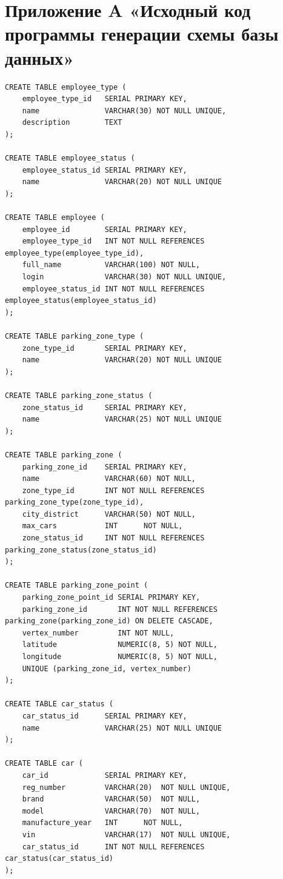 
\section*{Приложение A «Исходный код программы генерации схемы базы данных»}\label{app:A}

\begin{lstlisting}[style=sqlstyle, caption={SQL-скрипт для создания схемы базы данных}, label={lst:schema}]
CREATE TABLE employee_type (
    employee_type_id   SERIAL PRIMARY KEY,
    name               VARCHAR(30) NOT NULL UNIQUE,
    description        TEXT
);

CREATE TABLE employee_status (
    employee_status_id SERIAL PRIMARY KEY,
    name               VARCHAR(20) NOT NULL UNIQUE
);

CREATE TABLE employee (
    employee_id        SERIAL PRIMARY KEY,
    employee_type_id   INT NOT NULL REFERENCES employee_type(employee_type_id),
    full_name          VARCHAR(100) NOT NULL,
    login              VARCHAR(30) NOT NULL UNIQUE,
    employee_status_id INT NOT NULL REFERENCES employee_status(employee_status_id)
);

CREATE TABLE parking_zone_type (
    zone_type_id       SERIAL PRIMARY KEY,
    name               VARCHAR(20) NOT NULL UNIQUE
);

CREATE TABLE parking_zone_status (
    zone_status_id     SERIAL PRIMARY KEY,
    name               VARCHAR(25) NOT NULL UNIQUE
);

CREATE TABLE parking_zone (
    parking_zone_id    SERIAL PRIMARY KEY,
    name               VARCHAR(60) NOT NULL,
    zone_type_id       INT NOT NULL REFERENCES parking_zone_type(zone_type_id),
    city_district      VARCHAR(50) NOT NULL,
    max_cars           INT      NOT NULL,
    zone_status_id     INT NOT NULL REFERENCES parking_zone_status(zone_status_id)
);

CREATE TABLE parking_zone_point (
    parking_zone_point_id SERIAL PRIMARY KEY,
    parking_zone_id       INT NOT NULL REFERENCES parking_zone(parking_zone_id) ON DELETE CASCADE,
    vertex_number         INT NOT NULL,
    latitude              NUMERIC(8, 5) NOT NULL,
    longitude             NUMERIC(8, 5) NOT NULL,
    UNIQUE (parking_zone_id, vertex_number)
);

CREATE TABLE car_status (
    car_status_id      SERIAL PRIMARY KEY,
    name               VARCHAR(25) NOT NULL UNIQUE
);

CREATE TABLE car (
    car_id             SERIAL PRIMARY KEY,
    reg_number         VARCHAR(20)  NOT NULL UNIQUE,
    brand              VARCHAR(50)  NOT NULL,
    model              VARCHAR(70)  NOT NULL,
    manufacture_year   INT      NOT NULL,
    vin                VARCHAR(17)  NOT NULL UNIQUE,
    car_status_id      INT NOT NULL REFERENCES car_status(car_status_id)
);


\end{lstlisting}
